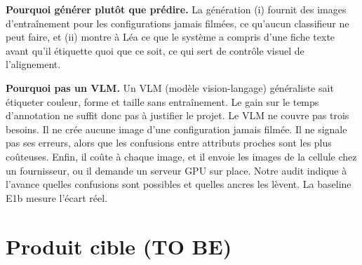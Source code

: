 \documentclass[10pt,a4paper]{article}
\begin{document}
\textbf{Pourquoi générer plutôt que prédire.} La génération (i) fournit des images d'entraînement pour les configurations jamais filmées, ce qu'aucun classifieur ne peut faire, et (ii) montre à Léa ce que le système a compris d'une fiche texte avant qu'il étiquette quoi que ce soit, ce qui sert de contrôle visuel de l'alignement.

\textbf{Pourquoi pas un VLM.} Un VLM (modèle vision-langage) généraliste sait étiqueter couleur, forme et taille sans entraînement. Le gain sur le temps d'annotation ne suffit donc pas à justifier le projet. Le VLM ne couvre pas trois besoins. Il ne crée aucune image d'une configuration jamais filmée. Il ne signale pas ses erreurs, alors que les confusions entre attributs proches sont les plus coûteuses. Enfin, il coûte à chaque image, et il envoie les images de la cellule chez un fournisseur, ou il demande un serveur GPU sur place. Notre audit indique à l'avance quelles confusions sont possibles et quelles ancres les lèvent. La baseline E1b mesure l'écart réel.

\section{Produit cible (TO BE)}
\end{document}
